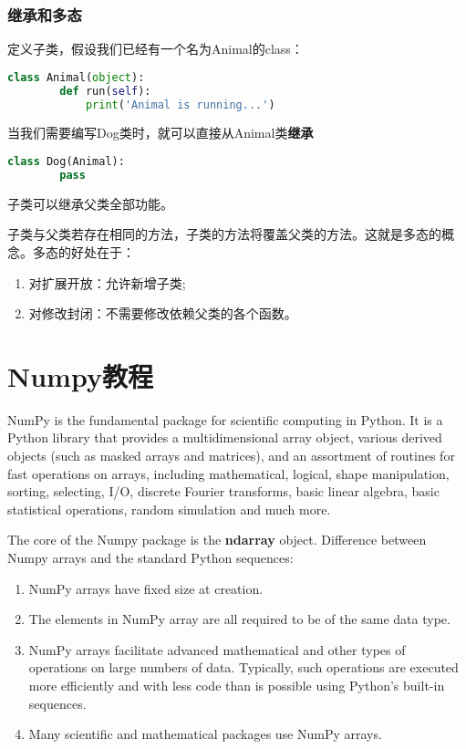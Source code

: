 \documentclass[12pt,a4paper]{article}
\begin{document}
\begin{CJK}{UTF8}{gbsn}
    \subsubsection{继承和多态}
    定义子类，假设我们已经有一个名为Animal的class：
    \begin{lstlisting}[language=python]
    class Animal(object):
        def run(self):
            print('Animal is running...')
    \end{lstlisting}
    当我们需要编写Dog类时，就可以直接从Animal类\textbf{继承}
    \begin{lstlisting}[language=python]
    class Dog(Animal):
        pass
    \end{lstlisting}
    子类可以继承父类全部功能。

    子类与父类若存在相同的方法，子类的方法将覆盖父类的方法。这就是多态的概念。多态的好处在于：
    \begin{enumerate}
        \item 对扩展开放：允许新增子类;
        \item 对修改封闭：不需要修改依赖父类的各个函数。
    \end{enumerate}
    \section{Numpy教程}
    NumPy is the fundamental package for scientific computing in Python. It is a Python library that provides a multidimensional array object, various derived objects (such as masked arrays and matrices), and an assortment of routines for fast operations on arrays, including mathematical, logical, shape manipulation, sorting, selecting, I/O, discrete Fourier transforms, basic linear algebra, basic statistical operations, random simulation and much more.

    The core of the Numpy package is the \textbf{ndarray} object. Difference between Numpy arrays and the standard Python sequences:
    \begin{enumerate}
        \item NumPy arrays have fixed size at creation.
        \item The elements in NumPy array are all required to be of the same data type.
        \item NumPy arrays facilitate advanced mathematical and other types of operations on large numbers of data. Typically, such operations are executed more efficiently and with less code than is possible using Python’s built-in sequences.
        \item Many scientific and mathematical packages use NumPy arrays.
    \end{enumerate}

\end{CJK}
\end{document}
